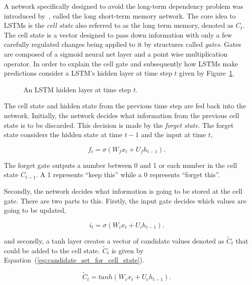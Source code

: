 A network specifically designed to avoid the long-term dependency problem was
introduced by~\cite{Hochreiter1997}, called the long short-term memory
network.
The core idea to LSTMs is the \textit{cell state} also referred to as the
long term memory, denoted as \(C_t\). The cell state is a vector designed to pass down
information with only a few carefully regulated changes being applied to it
by structures called \textit{gates}. Gates are composed of a sigmoid neural
net layer and a point wise multiplication operator. In order to explain
the cell gate and subsequently how LSTMs make predictions consider
a LSTM's hidden layer at time step \(t\) given by Figure~\ref{fig:lstm_cell}.

\begin{figure}[!htbp]
    \centering
    
    \caption{An LSTM hidden layer at time step \(t\).}\label{fig:lstm_cell}
\end{figure}

The cell state and hidden state from the previous time step are fed back
into the network. Initially, the network decides what information from the
previous cell state is to be discarded. This decision is made by the
\textit{forget state}. The forget state considers the hidden state at time
\(t-1\) and the input at time \(t\),

\begin{equation}\label{eq:forget_gate}
    f_{t} = \sigma(W_{f}x_{t} + U_{f}h_{t-1}).
\end{equation}

The forget gate outputs a number between 0 and 1 or each number in the cell
state \(C_{t-1}\). A 1 represents ``keep this'' while a 0 represents ``forget
this''.

Secondly, the network decides what information is going to be stored at the
cell gate. There are two parts to this. Firstly, the input gate decides which values
are going to be updated,

\begin{equation}\label{eq:input_gate}
    i_{t} = \sigma(W_{i}x_{t} + U_{i}h_{t-1}).
\end{equation}

and secondly, a tanh layer creates a vector of candidate values denoted as
\(\tilde{C}_{t}\) that could be added to the cell state. \(\tilde{C}_{t}\) 
is given by Equation~(\ref{eq:candidate_set_for_cell_state}).

\begin{equation}\label{eq:candidate_set_for_cell_state}
    \tilde{C}_{t} = tanh(W_{c}x_{t} + U_{c}h_{t-1}).
\end{equation}

